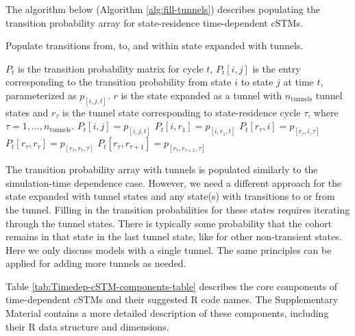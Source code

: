\documentclass[
]{article}
\begin{document}
The algorithm below (Algorithm \ref{alg:fill-tunnels}) describes populating the transition probability array for state-residence time-dependent cSTMs.

\begin{algorithm}
\caption{Populate transitions from, to, and within state expanded with tunnels.}\label{alg:fill-tunnels}
\begin{algorithmic}
  \Ensure $P_t$ is the transition probability matrix for cycle $t$, $P_t[i, j]$ is the entry corresponding to the transition probability from state $i$ to state $j$ at time $t$, parameterized as $p_{[i,j,t]}$.
  \Ensure $r$ is the state expanded as a tunnel with $n_{\text{tunnels}}$ tunnel states and $r_{\tau}$ is the tunnel state corresponding to state-residence cycle $\tau$, where $\tau=1,\ldots,n_{\text{tunnels}}$.
    \State $P_t[i, j] = p_{[i,j,t]}$ 
  \EndFor
    \State $P_t[i, r_{1}] = p_{[i,r_{1},t]}$
  \EndFor
      \State $P_t[r_{\tau}, i] = p_{[r_{\tau}, i,\tau]}$
        \State $P_t[r_{\tau}, r_{\tau}] = p_{[r_{\tau}, r_{\tau},\tau]}$
      \Else
        \State $P_t[r_{\tau}, r_{\tau+1}] = p_{[r_{\tau}, r_{\tau+1},\tau]}$
      \EndIf
    \EndFor
  \EndFor
\end{algorithmic}
\end{algorithm}

The transition probability array with tunnels is populated similarly to the simulation-time dependence case. However, we need a different approach for the state expanded with tunnel states and any state(s) with transitions to or from the tunnel. Filling in the transition probabilities for these states requires iterating through the tunnel states. There is typically some probability that the cohort remains in that state in the last tunnel state, like for other non-transient states. Here we only discuss models with a single tunnel. The same principles can be applied for adding more tunnels as needed.

Table \ref{tab:Timedep-cSTM-components-table} describes the core components of time-dependent cSTMs and their suggested R code names. The Supplementary Material contains a more detailed description of these components, including their R data structure and dimensions.
\end{document}
